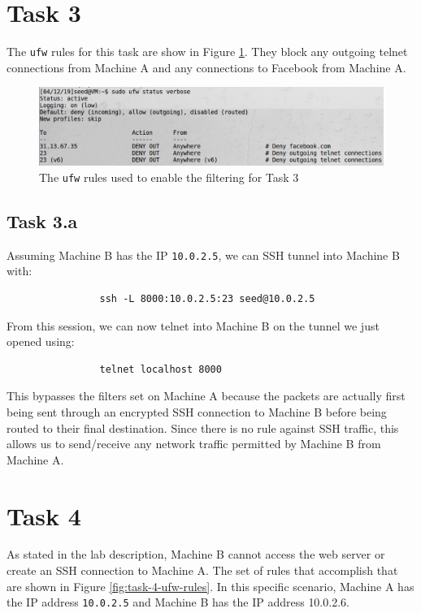 \documentclass[12pt,letterpaper]{article}
\begin{document}
	\section*{Task 3}
		The \texttt{ufw} rules for this task are show in Figure \ref{fig:task-3-ufw-rules}. They block any outgoing telnet connections from Machine A and any connections to Facebook from Machine A.
		
		\begin{figure}
			\begin{center}
				\includegraphics[width=\linewidth]{task-3-ufw-rules}
			\end{center}
			\caption{The \texttt{ufw} rules used to enable the filtering for Task 3}
			\label{fig:task-3-ufw-rules}
		\end{figure}
	
		\subsection*{Task 3.a}
			Assuming Machine B has the IP \texttt{10.0.2.5}, we can SSH tunnel into Machine B with:
			
			\begin{verbatim}
				ssh -L 8000:10.0.2.5:23 seed@10.0.2.5
			\end{verbatim}
			
			From this session, we can now telnet into Machine B on the tunnel we just opened using:
			
			\begin{verbatim}
				telnet localhost 8000
			\end{verbatim}
			
			This bypasses the filters set on Machine A because the packets are actually first being sent through an encrypted SSH connection to Machine B before being routed to their final destination. Since there is no rule against SSH traffic, this allows us to send/receive any network traffic permitted by Machine B from Machine A.
			
	\section*{Task 4}
		As stated in the lab description, Machine B cannot access the web server or create an SSH connection to Machine A. The set of rules that accomplish that are shown in Figure \ref{fig:task-4-ufw-rules}. In this specific scenario, Machine A has the IP address \texttt{10.0.2.5} and Machine B has the IP address {10.0.2.6}.
		
\end{document}
